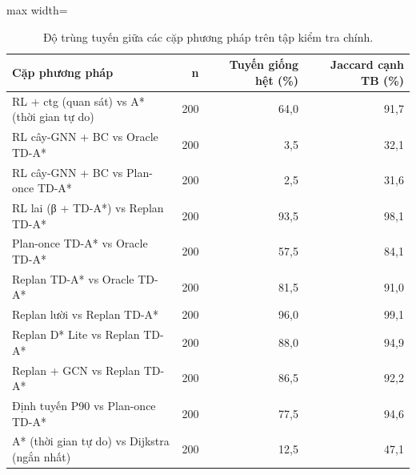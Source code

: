 \begin{table}[!htbp]
\centering
\small
\caption{Độ trùng tuyến giữa các cặp phương pháp trên tập kiểm tra chính.}
\label{tab:tab_route_overlap}
\begin{adjustbox}{max width=\linewidth}
\begin{tabular}{lrrr}
\toprule
Cặp phương pháp & n & Tuyến giống hệt (\%) & Jaccard cạnh TB (\%) \\
\midrule
RL + ctg (quan sát) vs A* (thời gian tự do) & 200 & 64{,}0 & 91{,}7 \\
RL cây-GNN + BC vs Oracle TD-A* & 200 & 3{,}5 & 32{,}1 \\
RL cây-GNN + BC vs Plan-once TD-A* & 200 & 2{,}5 & 31{,}6 \\
RL lai (β + TD-A*) vs Replan TD-A* & 200 & 93{,}5 & 98{,}1 \\
Plan-once TD-A* vs Oracle TD-A* & 200 & 57{,}5 & 84{,}1 \\
Replan TD-A* vs Oracle TD-A* & 200 & 81{,}5 & 91{,}0 \\
Replan lười vs Replan TD-A* & 200 & 96{,}0 & 99{,}1 \\
Replan D* Lite vs Replan TD-A* & 200 & 88{,}0 & 94{,}9 \\
Replan + GCN vs Replan TD-A* & 200 & 86{,}5 & 92{,}2 \\
Định tuyến P90 vs Plan-once TD-A* & 200 & 77{,}5 & 94{,}6 \\
A* (thời gian tự do) vs Dijkstra (ngắn nhất) & 200 & 12{,}5 & 47{,}1 \\
\bottomrule
\end{tabular}
\end{adjustbox}
\end{table}
